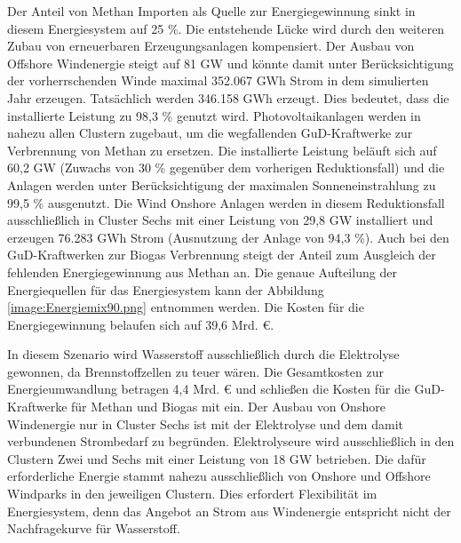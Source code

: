 Der Anteil von Methan Importen als Quelle zur Energiegewinnung sinkt in diesem Energiesystem auf 25 \%. Die entstehende Lücke wird durch den weiteren Zubau von erneuerbaren Erzeugungsanlagen kompensiert. Der Ausbau von Offshore Windenergie steigt auf 81 GW und könnte damit unter Berücksichtigung der vorherrschenden Winde maximal 352.067 GWh Strom in dem simulierten Jahr erzeugen. Tatsächlich werden 346.158 GWh erzeugt. Dies bedeutet, dass die installierte Leistung zu 98,3 \% genutzt wird.
Photovoltaikanlagen werden in nahezu allen Clustern zugebaut, um die wegfallenden GuD-Kraftwerke zur Verbrennung von Methan zu ersetzen. Die installierte Leistung beläuft sich auf 60,2 GW (Zuwachs von 30 \% gegenüber dem vorherigen Reduktionsfall) und die Anlagen werden unter Berücksichtigung der maximalen Sonneneinstrahlung zu 99,5 \% ausgenutzt.
Die Wind Onshore Anlagen werden in diesem Reduktionsfall ausschließlich in Cluster Sechs mit einer Leistung von 29,8 GW installiert und erzeugen 76.283 GWh Strom (Ausnutzung der Anlage von 94,3 \%). Auch bei den GuD-Kraftwerken zur Biogas Verbrennung steigt der Anteil zum Ausgleich der fehlenden Energiegewinnung aus Methan an. 
Die genaue Aufteilung der Energiequellen für das Energiesystem kann der Abbildung \ref{image:Energiemix90.png} entnommen werden.
Die Kosten für die Energiegewinnung belaufen sich auf 39,6 Mrd. €.


In diesem Szenario wird Wasserstoff ausschließlich durch die Elektrolyse gewonnen, da Brennstoffzellen zu teuer wären.
Die Gesamtkosten zur Energieumwandlung betragen 4,4 Mrd. € und schließen die Kosten für die GuD-Kraftwerke für Methan und Biogas mit ein.
Der Ausbau von Onshore Windenergie nur in Cluster Sechs ist mit der Elektrolyse und dem damit verbundenen Strombedarf zu begründen. 
Elektrolyseure wird ausschließlich in den Clustern Zwei und Sechs mit einer Leistung von 18 GW betrieben. Die dafür erforderliche Energie stammt nahezu ausschließlich von Onshore und Offshore Windparks in den jeweiligen Clustern. Dies erfordert Flexibilität im Energiesystem, denn das Angebot an Strom aus Windenergie entspricht nicht der Nachfragekurve für Wasserstoff. 

